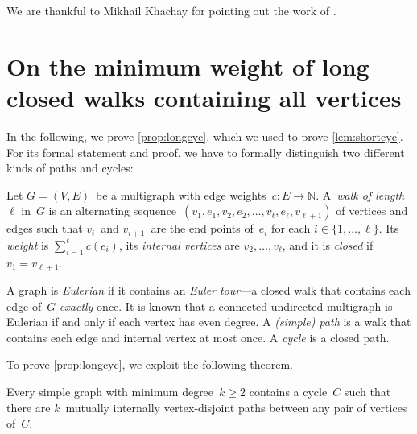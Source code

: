 \documentclass[natbib,sort,smallextended,envcountsame,envcountsect,numbook]{svjour3}
\begin{document}
\begin{acknowledgements}
  We are thankful 
  to Mikhail Khachay for pointing out the work of \citet{Mad74}.
\end{acknowledgements}




\appendix
\section{On the minimum weight of long closed walks containing all vertices}
\label{appendix}
In the following,
we prove \cref{prop:longcyc},
which we used to prove \cref{lem:shortcyc}.
For its formal statement and proof,
we have to formally distinguish two different kinds of paths and cycles:

\begin{definition}
  Let \(G=(V,E)\)~be a multigraph with edge weights~\(c\colon E\to\mathbb N\).
  A~\emph{walk of length}~\(\ell\) in~\(G\)
  is an alternating sequence~\((v_1,e_1,v_2,e_2,\dots,v_\ell,e_\ell,v_{\ell+1})\)
  of vertices and edges
  such that
  \(v_i\)~and \(v_{i+1}\)~are the end points of~\(e_i\)
  for each \(i\in\{1,\dots,\ell\}\).
  Its \emph{weight} is \(\sum_{i=1}^{\ell}c(e_i)\), its
  \emph{internal vertices} are \(v_2,\dots,v_\ell\), and
  it is \emph{closed} if \(v_1=v_{\ell+1}\).

  A graph is \emph{Eulerian} if it contains an \emph{Euler tour}---a closed walk
  that contains each edge of~\(G\) \emph{exactly} once.
  It is known that a connected undirected multigraph is Eulerian
  if and only if each vertex has even degree.
  A \emph{(simple) path} is a walk that contains each edge
  and
  internal vertex at most once.
  A \emph{cycle} is a closed path.
\end{definition}


\noindent
To prove \cref{prop:longcyc}, we exploit the following theorem.
\begin{theorem}\label{mader}
  Every simple graph with minimum degree~\(k\geq 2\) contains a cycle~\(C\)
  such that there are \(k\)~mutually internally vertex-disjoint paths
  between any pair of vertices of~\(C\).
\end{theorem}
\end{document}
